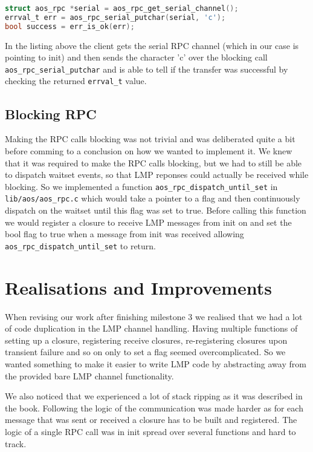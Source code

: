 \begin{lstlisting}[language=c, caption=Example of child calling an RPC function]
struct aos_rpc *serial = aos_rpc_get_serial_channel();
errval_t err = aos_rpc_serial_putchar(serial, 'c');
bool success = err_is_ok(err);
\end{lstlisting}

In the listing above the client gets the serial RPC channel (which in our case is pointing to init) and then sends the character 'c' over the blocking call \verb|aos_rpc_serial_putchar| and is able to tell if the transfer was successful by checking the returned \verb|errval_t| value.

\subsection{Blocking RPC}
Making the RPC calls blocking was not trivial and was deliberated quite a bit before comming to a conclusion on how we wanted to implement it. We knew that it was required to make the RPC calls blocking, but we had to still be able to dispatch waitset events, so that LMP reponses could actually be received while blocking. So we implemented a function \verb|aos_rpc_dispatch_until_set| in \verb|lib/aos/aos_rpc.c| which would take a pointer to a flag and then continuously dispatch on the waitset until this flag was set to true. Before calling this function we would register a closure to receive LMP messages from init on and set the bool flag to true when a message from init was received allowing \verb|aos_rpc_dispatch_until_set| to return.

\section{Realisations and Improvements}

When revising our work after finishing milestone 3 we realised that we had a lot of code duplication in the LMP channel handling. Having multiple functions of setting up a closure, registering receive closures, re-registering closures upon transient failure and so on only to set a flag seemed overcomplicated. So we wanted something to make it easier to write LMP code by abstracting away from the provided bare LMP channel functionality.

We also noticed that we experienced a lot of stack ripping as it was described in the book. Following the logic of the communication was made harder as for each message that was sent or received a closure has to be built and registered. The logic of a single RPC call was in init spread over several functions and hard to track.

